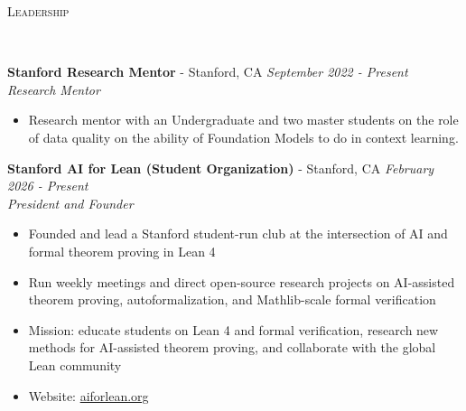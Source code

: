 \documentclass{article}
\newenvironment{changemargin}[2]{%
  \begin{list}{}{%
    \setlength{\topsep}{0pt}%
    \setlength{\leftmargin}{#1}%
    \setlength{\rightmargin}{#2}%
    \setlength{\listparindent}{\parindent}%
    \setlength{\itemindent}{\parindent}%
    \setlength{\parsep}{\parskip}%
  }%
  \item[]}{\end{list}
}
\newcommand{\lineover}{
	\begin{changemargin}{-0.05in}{-0.05in}
		\vspace*{-8pt}
		\hrulefill \\
		\vspace*{-2pt}
	\end{changemargin}
}
\newcommand{\header}[1]{
	\begin{changemargin}{-0.5in}{-0.5in}
		\scshape{#1}\\
  	\lineover
	\end{changemargin}
}
\newenvironment{body} {
	\vspace*{-16pt}
	\begin{changemargin}{-0.25in}{-0.5in}
  }	
	{\end{changemargin}
}
\begin{document}
\newpage

\header{Leadership}

\begin{body}

    \vspace{16pt}

      \textbf{Stanford Research Mentor} - Stanford, CA \hfill \emph{September 2022 - Present}\\
	\emph{Research Mentor}\\
	\vspace*{-3pt}
	\begin{itemize} \itemsep -2pt  %
    	\item Research mentor with an Undergraduate and two master students on the role of data quality on the ability of Foundation Models to do in context learning.
	\end{itemize}
	\vspace{5 pt}

 	\textbf{Stanford AI for Lean (Student Organization)} - Stanford, CA \hfill \emph{February 2026 - Present}\\
	\emph{President and Founder}\\
	\vspace*{-3pt}
	\begin{itemize} \itemsep -2pt  %
    	\item Founded and lead a Stanford student-run club at the intersection of AI and formal theorem proving in Lean 4
    	\item Run weekly meetings and direct open-source research projects on AI-assisted theorem proving, autoformalization, and Mathlib-scale formal verification
    	\item Mission: educate students on Lean 4 and formal verification, research new methods for AI-assisted theorem proving, and collaborate with the global Lean community
    	\item Website: \href{https://aiforlean.org}{aiforlean.org}
	\end{itemize}
	\vspace{5 pt}


\end{body}
\end{document}
